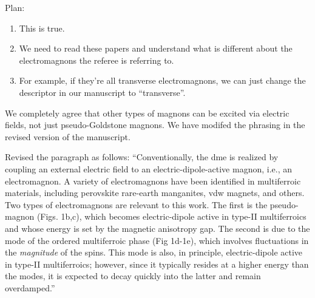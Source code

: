 Plan:
\begin{enumerate}
\item This is true.
\item We need to read these papers and understand what is different about the electromagnons the referee is referring to.
\item For example, if they're all transverse electromagnons, we can just change the descriptor in our manuscript to ``transverse''.
\end{enumerate}

We completely agree that other types of magnons can be excited via electric fields, not just pseudo-Goldstone magnons.
We have modifed the phrasing in the revised version of the manuscript.

\begin{changesmade}
Revised the paragraph as follows: ``Conventionally, the \gls{dme} is realized by coupling an external electric field to an electric-dipole-active magnon, i.e., an electromagnon.
A variety of electromagnons have been identified in multiferroic materials, including perovskite rare-earth manganites\citep{kida_terahertz_2009,tokura_multiferroics_2014}, \gls{vdw} magnets\citep{kim_terahertz_2023}, and others.
Two types of electromagnons are relevant to this work.
The first is the pseudo-\goldstone magnon (Figs. 1b,c), which becomes electric-dipole active in type-II multiferroics and whose energy is set by the magnetic anisotropy gap.
The second is due to the \higgs mode of the ordered multiferroic phase (Fig 1d-1e), which involves fluctuations in the \textit{magnitude} of the spins.
This mode is also, in principle, electric-dipole active in type-II multiferroics;\cite{matsumoto_electromagnon_2014} however, since it typically resides at a higher energy than the \goldstone modes, it is expected to decay quickly into the latter and remain overdamped.\citep{jain_higgs_2017}''
\end{changesmade}
